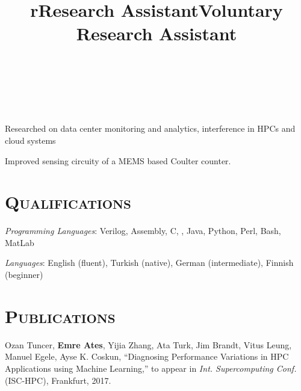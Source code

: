 \begin{resume}
	\begin{formatb}
		\title{r}\\
		\\
		\body\\
	\end{formatb}
	
	\title{Research Assistant}
	\begin{position}
		Researched on data center monitoring and analytics, interference in HPCs and
    cloud systems 
	\end{position}
	
	\title{Voluntary Research Assistant}
	\begin{position}
		Improved sensing circuity of a MEMS based Coulter counter. 
	\end{position}
	
	\section{\textsc{Qualifications}}
	
	\emph{Programming Languages}: Verilog, Assembly, C, \Cplusplus, Java, Python,
	Perl, Bash, MatLab
	\setlength{\parskip}{1mm}
	
	
	
	
	\emph{Languages}: English (fluent), Turkish (native), German (intermediate),
  Finnish (beginner) 

  \section{\textsc{Publications}}
  Ozan Tuncer, \textbf{Emre Ates}, Yijia Zhang, Ata Turk, Jim Brandt, Vitus
  Leung, Manuel Egele, Ayse K. Coskun, ``Diagnosing Performance Variations in
  HPC Applications using Machine Learning,'' to appear in \textit{Int.
    Supercomputing Conf.} (ISC-HPC), Frankfurt, 2017.
	

\end{resume}
